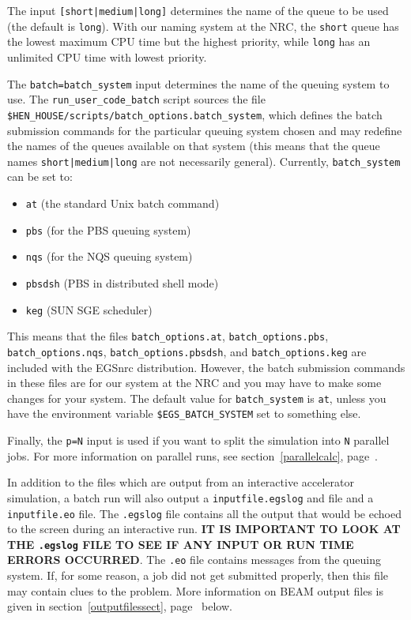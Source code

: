 \documentclass[12pt,twoside]{article}
\begin{document}
The input {\tt [short|medium|long]} determines the name of the queue to be used
(the default is {\tt long}).  With our naming system at the NRC,
the {\tt short} queue
has the lowest maximum CPU time but the highest priority, while {\tt long} has
an unlimited CPU time with lowest priority.

The {\tt batch=batch\_system} input
determines the name of the queuing system to use.  The
{\tt run\_user\_code\_batch} script sources the file
{\tt \$HEN\_HOUSE/scripts/batch\_options.batch\_system}, which defines
the batch submission commands for the particular queuing system chosen
and may redefine the names of the queues available on that system
(this means that the queue names {\tt short|medium|long} are not
necessarily general).  Currently, {\tt batch\_system} can be set to:
\begin{itemize}
\item {\tt at} (the standard Unix batch command)
\item {\tt pbs} (for the
PBS queuing system)
\item {\tt nqs} (for the NQS queuing system)
\item {\tt pbsdsh} (PBS in distributed shell mode)
\item {\tt keg} (SUN SGE scheduler)
\end{itemize}
This means that the files
{\tt batch\_options.at}, {\tt batch\_options.pbs},
{\tt batch\_options.nqs}, {\tt batch\_options.pbsdsh}, and
{\tt batch\_options.keg} are included with the EGSnrc distribution.  However,
the batch submission commands in these files are for our system at the NRC
and you may have to make some changes for your system.  The default
value for {\tt batch\_system} is {\tt at}, unless you have the environment
variable {\tt \$EGS\_BATCH\_SYSTEM} set to something else.

Finally, the {\tt p=N} input is used if you want to split the simulation
into {\tt N} parallel jobs.  For more information on parallel runs,
see section~\ref{parallelcalc}, page~\pageref{parallelcalc}.

In addition to the files which are output from an interactive accelerator
simulation, a batch run will also output a {\tt inputfile.egslog} and
file and a
{\tt inputfile.eo} file.  The {\tt .egslog} file contains all the output
that would be echoed to the screen during an interactive run.  {\bfseries
IT IS IMPORTANT
TO LOOK AT THE {\tt .egslog} FILE TO SEE IF ANY INPUT OR RUN TIME ERRORS
OCCURRED}.  The {\tt .eo} file contains messages from the queuing system.  If,
for some reason, a job did not get submitted properly, then this file may
contain clues to the problem.  More information on BEAM output files is given
in section~\ref{outputfilessect}, page~\pageref{outputfilessect} below.
\end{document}
